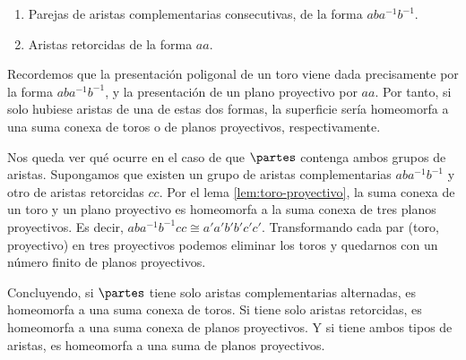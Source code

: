 {    \begin{enumerate}
        \item Parejas de aristas complementarias consecutivas, de la forma $aba^{-1}b^{-1}$.
        \item Aristas retorcidas de la forma $aa$.
    \end{enumerate}

    \noindent
    Recordemos que la presentación poligonal de un toro viene dada precisamente por la forma $a b a^{-1} b^{-1}$, 
    y la presentación de un plano proyectivo por $aa$. 
    Por tanto, si solo hubiese aristas de una de estas dos formas, 
    la superficie sería homeomorfa a una suma conexa de toros o de planos proyectivos, respectivamente.

    \vspace{0.5em}
    \noindent
    Nos queda ver qué ocurre en el caso de que $\partes$ contenga ambos grupos de aristas. 
    Supongamos que existen un grupo de aristas complementarias $aba^{-1}b^{-1}$ y otro de aristas retorcidas $cc$. 
    Por el lema \ref{lem:toro-proyectivo}, la suma conexa de un toro y un plano proyectivo es homeomorfa a la suma conexa de tres planos proyectivos. 
    Es decir, $aba^{-1}b^{-1}cc \cong a'a'b'b'c'c'$. 
    Transformando cada par (toro, proyectivo) en tres proyectivos podemos eliminar los toros y quedarnos con un número finito de planos proyectivos.

    \vspace{0.5em}
    \noindent
    Concluyendo, si $\partes$ tiene solo aristas complementarias alternadas, es homeomorfa a una suma conexa de toros. 
    Si tiene solo aristas retorcidas, es homeomorfa a una suma conexa de planos proyectivos. 
    Y si tiene ambos tipos de aristas, es homeomorfa a una suma de planos proyectivos.
}
